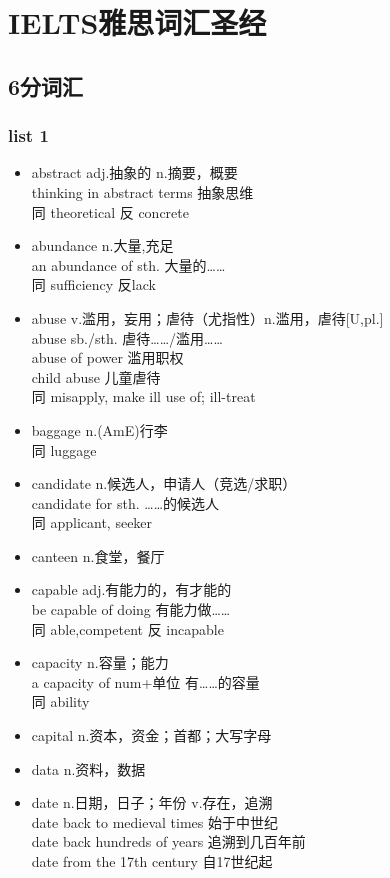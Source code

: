 \chapter{IELTS雅思词汇圣经}
\section{6分词汇}
\subsection{list 1}
\begin{multicols}{2}
\begin{itemize}
    \item abstract adj.抽象的 n.摘要，概要\\thinking in abstract terms 抽象思维\\同 theoretical 反 concrete
    \item abundance n.大量,充足\\an abundance of sth. 大量的……\\同 sufficiency 反lack
    \item abuse v.滥用，妄用；虐待（尤指性）n.滥用，虐待[U,pl.]\\abuse sb./sth. 虐待……/滥用……\\ abuse of power 滥用职权\\ child abuse 儿童虐待\\同 misapply, make ill use of; ill-treat
    \item baggage n.(AmE)行李 \\同 luggage
    \item candidate n.候选人，申请人（竞选/求职）\\candidate for sth. ……的候选人\\同 applicant, seeker
    \item canteen n.食堂，餐厅
    \item capable adj.有能力的，有才能的\\be capable of doing 有能力做……\\同 able,competent 反 incapable
    \item capacity n.容量；能力\\a capacity of num+单位 有……的容量\\同 ability
    \item capital n.资本，资金；首都；大写字母
    \item data n.资料，数据
    \item date n.日期，日子；年份 v.存在，追溯\\date back to medieval times 始于中世纪\\date back hundreds of years 追溯到几百年前\\date from the 17th century 自17世纪起

\end{itemize}
\end{multicols}
